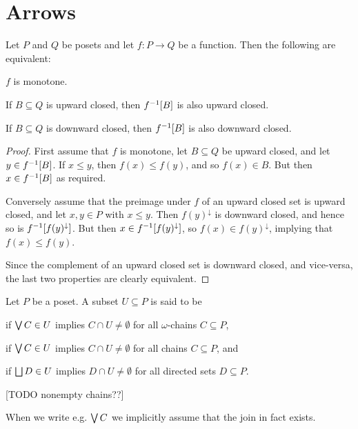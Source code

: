 \documentclass[a4paper, 11pt, article, danish, oneside]{memoir}
\DeclarePairedDelimiter{\auxdelimbracket}{[}{]}
\DeclareMathOperator*{\smallbigvee}{\textstyle\bigvee}
\DeclareMathOperator*{\bigjoin}{\mathchoice
    {\smallbigvee}%
    {\bigvee}%
    {\bigvee}%
    {\bigvee}%
}
\DeclareMathOperator*{\smallbigsqcup}{\textstyle\bigsqcup}
\DeclareMathOperator*{\bigdjoin}{\mathchoice
    {\smallbigsqcup}%
    {\bigsqcup}%
    {\bigsqcup}%
    {\bigsqcup}%
}
\newcommand*\intersect\cap
\newcommand{\preim}[2][]{^{-1}\auxdelimbracket[#1]{#2}}
\begin{document}
\section{Arrows}

\begin{proposition}
    Let $P$ and $Q$ be posets and let $f \colon P \to Q$ be a function. Then the following are equivalent:
    \begin{enumlem}
        \item $f$ is monotone.
        \item If $B \subseteq Q$ is upward closed, then $f\preim{B}$ is also upward closed.
        \item If $B \subseteq Q$ is downward closed, then $f\preim{B}$ is also downward closed.
    \end{enumlem}
\end{proposition}

\begin{proof}
    First assume that $f$ is monotone, let $B \subseteq Q$ be upward closed, and let $y \in f\preim{B}$. If $x \leq y$, then $f(x) \leq f(y)$, and so $f(x) \in B$. But then $x \in f\preim{B}$ as required.

    Conversely assume that the preimage under $f$ of an upward closed set is upward closed, and let $x,y \in P$ with $x \leq y$. Then $f(y)^\downarrow$ is downward closed, and hence so is $f\preim{f(y)^\downarrow}$. But then $x \in f\preim{f(y)^\downarrow}$, so $f(x) \in f(y)^\downarrow$, implying that $f(x) \leq f(y)$.

    Since the complement of an upward closed set is downward closed, and vice-versa, the last two properties are clearly equivalent.
\end{proof}


\begin{definition}
    Let $P$ be a poset. A subset $U \subseteq P$ is said to be
    \begin{enumdef}
        \item {} if $\bigjoin C \in U$ implies $C \intersect U \neq \emptyset$ for all $\omega$-chains $C \subseteq P$,

        \item {} if $\bigjoin C \in U$ implies $C \intersect U \neq \emptyset$ for all chains $C \subseteq P$, and

        \item {} if $\bigdjoin D \in U$ implies $D \intersect U \neq \emptyset$ for all directed sets $D \subseteq P$.
    \end{enumdef}
    [TODO nonempty chains??]
\end{definition}
%
When we write e.g. $\bigjoin C$ we implicitly assume that the join in fact exists.
\end{document}
